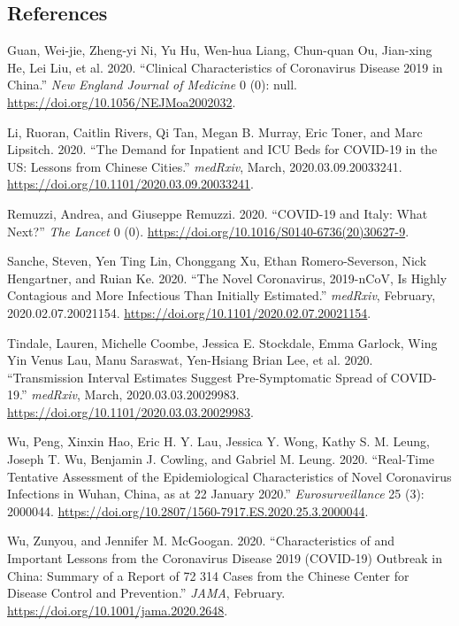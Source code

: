\documentclass[
]{article}
\begin{document}
\hypertarget{references}{%
\subsection*{References}\label{references}}

\hypertarget{refs}{}
\leavevmode\hypertarget{ref-guan2020}{}%
Guan, Wei-jie, Zheng-yi Ni, Yu Hu, Wen-hua Liang, Chun-quan Ou,
Jian-xing He, Lei Liu, et al. 2020. ``Clinical Characteristics of
Coronavirus Disease 2019 in China.'' \emph{New England Journal of
Medicine} 0 (0): null. \url{https://doi.org/10.1056/NEJMoa2002032}.

\leavevmode\hypertarget{ref-li2020}{}%
Li, Ruoran, Caitlin Rivers, Qi Tan, Megan B. Murray, Eric Toner, and
Marc Lipsitch. 2020. ``The Demand for Inpatient and ICU Beds for
COVID-19 in the US: Lessons from Chinese Cities.'' \emph{medRxiv},
March, 2020.03.09.20033241.
\url{https://doi.org/10.1101/2020.03.09.20033241}.

\leavevmode\hypertarget{ref-remuzzi2020}{}%
Remuzzi, Andrea, and Giuseppe Remuzzi. 2020. ``COVID-19 and Italy: What
Next?'' \emph{The Lancet} 0 (0).
\url{https://doi.org/10.1016/S0140-6736(20)30627-9}.

\leavevmode\hypertarget{ref-sanche2020}{}%
Sanche, Steven, Yen Ting Lin, Chonggang Xu, Ethan Romero-Severson, Nick
Hengartner, and Ruian Ke. 2020. ``The Novel Coronavirus, 2019-nCoV, Is
Highly Contagious and More Infectious Than Initially Estimated.''
\emph{medRxiv}, February, 2020.02.07.20021154.
\url{https://doi.org/10.1101/2020.02.07.20021154}.

\leavevmode\hypertarget{ref-tindale2020}{}%
Tindale, Lauren, Michelle Coombe, Jessica E. Stockdale, Emma Garlock,
Wing Yin Venus Lau, Manu Saraswat, Yen-Hsiang Brian Lee, et al. 2020.
``Transmission Interval Estimates Suggest Pre-Symptomatic Spread of
COVID-19.'' \emph{medRxiv}, March, 2020.03.03.20029983.
\url{https://doi.org/10.1101/2020.03.03.20029983}.

\leavevmode\hypertarget{ref-wu2020a}{}%
Wu, Peng, Xinxin Hao, Eric H. Y. Lau, Jessica Y. Wong, Kathy S. M.
Leung, Joseph T. Wu, Benjamin J. Cowling, and Gabriel M. Leung. 2020.
``Real-Time Tentative Assessment of the Epidemiological Characteristics
of Novel Coronavirus Infections in Wuhan, China, as at 22 January
2020.'' \emph{Eurosurveillance} 25 (3): 2000044.
\url{https://doi.org/10.2807/1560-7917.ES.2020.25.3.2000044}.

\leavevmode\hypertarget{ref-wu2020}{}%
Wu, Zunyou, and Jennifer M. McGoogan. 2020. ``Characteristics of and
Important Lessons from the Coronavirus Disease 2019 (COVID-19) Outbreak
in China: Summary of a Report of 72 314 Cases from the Chinese Center
for Disease Control and Prevention.'' \emph{JAMA}, February.
\url{https://doi.org/10.1001/jama.2020.2648}.
\end{document}

